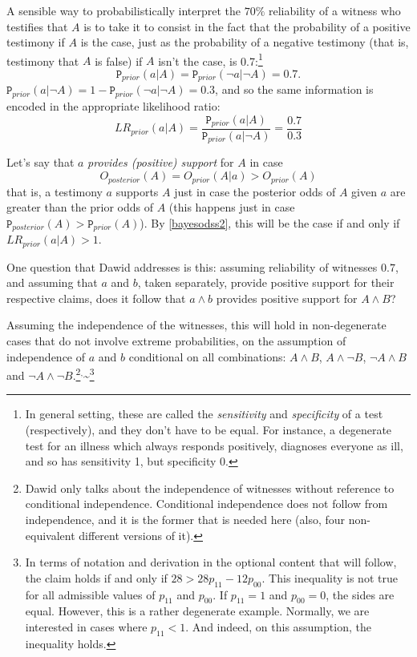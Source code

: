 \documentclass[10pt,dvipsnames,enabledeprecatedfontcommands]{scrartcl}
\newcommand{\n}{\neg}
\newcommand{\et}{\wedge}
\newcommand{\prr}[1]{\mbox{$\mathtt{P}_{prior}(#1)$}}
\newcommand{\prp}[1]{\mbox{$\mathtt{P}_{posterior}(#1)$}}
\begin{document}
A sensible way to probabilistically interpret the \(70\%\) reliability
of a witness who testifies that \(A\) is to take it to consist in the
fact that the probability of a positive testimony if \(A\) is the case,
just as the probability of a negative testimony (that is, testimony that
\(A\) is false) if \(A\) isn't the case, is
0.7:\footnote{In general setting, these are called the \emph{sensitivity} and \emph{specificity} of a test (respectively), and they don't have to be equal. For instance, a degenerate test for an illness which always responds positively, diagnoses everyone as ill, and so has sensitivity 1, but specificity 0.}
\[\prr{a\vert A}=\prr{\n a\vert\n  A}=0.7.\]
\noindent   \(\prr{a\vert \n A}=1- \prr{\n a\vert \n A}=0.3\), and so
the same information is encoded in the appropriate likelihood ratio:
\[LR_{prior}(a\vert A )=\frac{\prr{a\vert A}}{\prr{a\vert \n A}}= \frac{0.7}{0.3}\]

Let's say that \(a\) \emph{provides (positive) support} for \(A\) in
case \[O_{posterior}(A)=O_{prior}(A\vert a)> O_{prior}(A)\]
\noindent  that is, a testimony \(a\) supports \(A\) just in case the
posterior odds of \(A\) given \(a\) are greater than the prior odds of
\(A\) (this happens just in case \(\prp{A}>\prr{A}\)). By
\eqref{bayesodss2}, this will be the case if and only if
\(LR_{prior}(a\vert A)>1\).

One question that Dawid addresses is this: assuming reliability of
witnesses \(0.7\), and assuming that \(a\) and \(b\), taken separately,
provide positive support for their respective claims, does it follow
that \(a \et b\) provides positive support for \(A\et B\)?

Assuming the independence of the witnesses, this will hold in
non-degenerate cases that do not involve extreme probabilities, on the
assumption of independence of \(a\) and \(b\) conditional on all
combinations: \(A\et B\), \(A\et \n B\), \(\n A \et B\) and
\(\n A \et \n B\).\footnote{Dawid only talks about the independence of witnesses without reference to  conditional independence. Conditional independence does not follow from independence, and it is the former that is needed here (also, four non-equivalent different versions of it).}\(^,\)\textasciitilde{}\footnote{In terms of notation and derivation in the optional content that will follow, the claim holds  if and only if $28 > 28 p_{11}-12p_{00}$.  This inequality is not  true for all admissible values of $p_{11}$ and $p_{00}$. If $p_{11}=1$ and $p_{00}=0$, the sides are equal. However, this is a rather degenerate example. Normally, we are  interested in cases where $p_{11}< 1$. And indeed, on this assumption, the inequality holds.}
\end{document}
